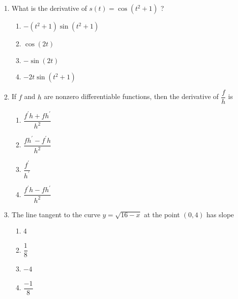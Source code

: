\documentclass{article}
\begin{document}
\begin{enumerate}
\begin{minipage}[t]{\linewidth}
\begin{enumerate}
		\end{enumerate}
	\end{minipage}
	\item
	\begin{minipage}[t]{\linewidth}
		What is the derivative of \(s(t)=\cos \left(t^2 + 1\right)\) ?\\[0.1em]
		\begin{enumerate}
		\itemsep1em
			\item  $-(t^2+1)\sin(t^2+1)$
			\item  $\cos(2t)$
			\item  $-\sin(2t)$
			\item  $-2t\sin(t^2+1)$
		\end{enumerate}
	\end{minipage}
	\item
	\begin{minipage}[t]{\linewidth}
		If \(f\) and \(h\) are nonzero differentiable functions, then the
derivative of \(\dfrac{f}{h}\) is\\[0.1em]
		\begin{enumerate}
		\itemsep1em
			\item  $\dfrac{f^{\prime} h + f h^{\prime}}{h^2}$
			\item  $\dfrac{f h^{\prime} - f^{\prime} h}{h^{2}}$
			\item  $\dfrac{f^{\prime}}{h^{\prime}}$
			\item  $\dfrac{f^{\prime} h - f h^{\prime}}{h^2}$
		\end{enumerate}
	\end{minipage}
	\item
	\begin{minipage}[t]{\linewidth}
		The line tangent to the curve \(y=\sqrt{16-x}\) at the point \((0,4)\)
has slope\\[0.1em]
		\begin{enumerate}
		\itemsep1em
			\item  4
			\item  $\dfrac{1}{8}$
			\item  $-4$
			\item  $\dfrac{-1}{8}$
		\end{enumerate}
	\end{minipage}

\end{enumerate}
\end{document}
